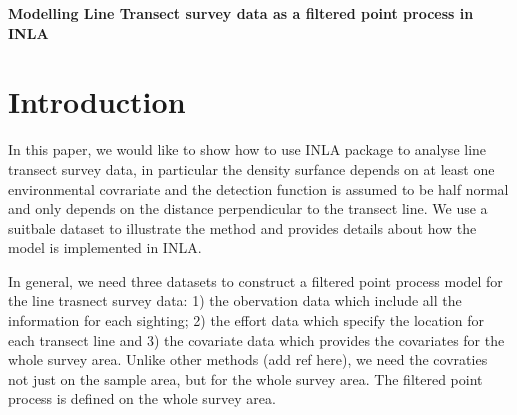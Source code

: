 \documentclass[a4paper]{article}\usepackage[]{graphicx}\usepackage[]{color}
\begin{document}




% 







{\Large{\textbf{Modelling Line Transect survey data as a filtered point process in INLA}}}
\section{Introduction}
In this paper, we would like to show how to use INLA package to analyse line transect survey data, in particular the density surfance depends on at least one environmental covrariate and the detection function is assumed to be half normal and only depends on the distance perpendicular to the transect line. We use a suitbale dataset to illustrate the method and provides details about how the model is implemented in INLA. 

In general, we need three datasets to construct a filtered point process model for the line trasnect survey data: 1) the obervation data which include all the information for each sighting; 2) the effort data which specify the location for each transect line and 3) the covariate data which provides the covariates for the whole survey area. Unlike other methods (add ref here), we need the covraties not just on the sample area, but for the whole survey area. The filtered point process is defined on the whole survey area. 
\end{document}
